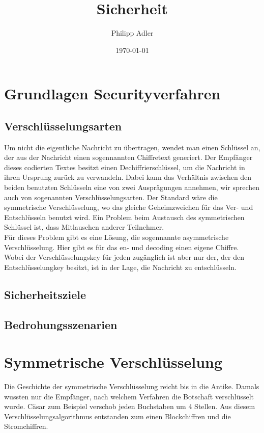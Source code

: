 \documentclass[11pt]{scrartcl}
\title{Sicherheit}
\author{Philipp Adler}
\date{\today{}}
\begin{document}
\maketitle
\pagebreak
\tableofcontents
\pagebreak

\section{Grundlagen Securityverfahren}
\label{sec:basics-security-process}

\subsection{Verschlüsselungsarten}
\label{sec:ciphering types}
Um nicht die eigentliche Nachricht zu übertragen, wendet man einen Schlüssel an, der aus der Nachricht einen sogennannten Chiffretext generiert. Der Empfänger dieses codierten Textes besitzt einen Dechiffrierschlüssel, um die Nachricht in ihren Ursprung zurück zu verwandeln. \grqq{}Dabei kann das Verhältnis zwischen den beiden benutzten Schlüsseln eine von zwei Ausprägungen annehmen, wir sprechen auch von sogenannten Verschlüsselungsarten.\grqq{}\cite{5} Der Standard wäre die symmetrische Verschlüsselung, wo das gleiche Geheimzweichen für das Ver- und Entschlüsseln benutzt wird. Ein Problem beim Austausch des symmetrischen Schlüssel ist, dass Mitlauschen anderer Teilnehmer.\\
Für dieses Problem gibt es eine Lösung, die sogennannte asymmetrische Verschlüsselung. Hier gibt es für das en- und decoding einen eigene Chiffre. Wobei der Verschlüsselungskey für jeden zugänglich ist aber nur der, der den Entschlüsselungkey besitzt, ist in der Lage, die Nachricht zu entschlüsseln. \cite{1}

\subsection{Sicherheitsziele}
\label{sec:security goals}

\subsection{Bedrohungsszenarien}
\label{sec:threat scenarios}


\section{Symmetrische Verschlüsselung}
\label{sec:symetric-ciphering}
Die Geschichte der symmetrische Verschlüsselung reicht bis in die Antike. Damals wussten nur die Empfänger, nach welchem Verfahren die Botschaft verschlüsselt wurde. Cäsar zum Beispiel verschob jeden Buchstaben um 4 Stellen. Aus diesem Verschlüsselungsalgorithmus entstanden zum einen Blockchiffren und die Stromchiffren. \cite{1}
\end{document}
